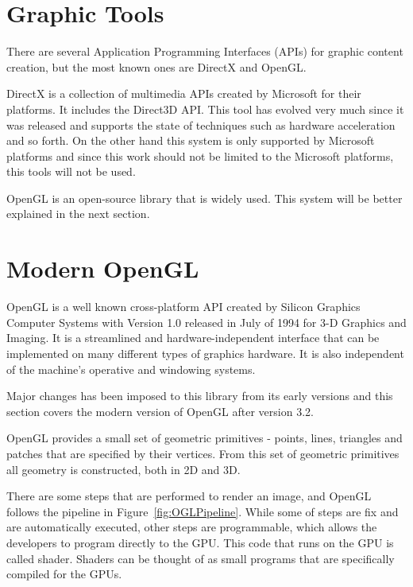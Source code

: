 
\section{Graphic Tools} %
\label{sec:graphic_tools}
There are several Application Programming Interfaces (APIs) for graphic content creation, but the most known ones are DirectX and OpenGL. 

DirectX is a collection of multimedia APIs created by Microsoft for their platforms. It includes the Direct3D API. This tool has evolved very much since it was released and supports the state of techniques such as hardware acceleration and so forth.  On the other hand this system is only supported by Microsoft platforms and since this work should not be limited to the Microsoft platforms, this tools will not be used. 

OpenGL is an open-source library that is widely used. This system will be better explained in the next section.

\section{Modern OpenGL} %
\label{sec:modern_opengl}


OpenGL is a well known cross-platform API created by Silicon Graphics Computer Systems with Version 1.0 released in July of 1994 for 3-D Graphics and Imaging. It is a streamlined and hardware-independent interface that can be implemented on many different types of graphics hardware. It is also independent of the machine's operative and windowing systems.

Major changes has been imposed to this library from its early versions and this section covers the modern version of OpenGL after version 3.2.

OpenGL provides a small set of geometric primitives - points, lines, triangles and patches that are specified by their vertices. From this set of geometric primitives all geometry is constructed, both in 2D and 3D. 

There are some steps that are performed to render an image, and OpenGL follows the pipeline in Figure~\ref{fig:OGLPipeline}. While some of steps are fix and are automatically executed, other steps are programmable, which allows the developers to program directly to the GPU. This code that runs on the GPU is called shader. Shaders can be thought of as small programs that are specifically compiled for the GPUs\cite{shreiner2013opengl}.


